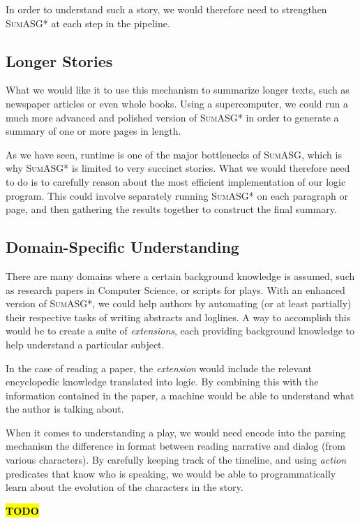 \begin{itemize}[nolisstep]

\end{itemize}

In order to understand such a story, we would therefore need to strengthen \textsc{SumASG*} at each step in the pipeline.

\subsection{Longer Stories}

What we would like it to use this mechanism to summarize longer texts, such as newspaper articles or even whole books. Using a supercomputer, we could run a much more advanced and polished version of \textsc{SumASG*} in order to generate a summary of one or more pages in length.

As we have seen, runtime is one of the major bottlenecks of \textsc{SumASG}, which is why \textsc{SumASG*} is limited to very succinct stories. What we would therefore need to do is to carefully reason about the most efficient implementation of our logic program. This could involve separately running \textsc{SumASG*} on each paragraph or page, and then gathering the results together to construct the final summary.

\subsection{Domain-Specific Understanding}

There are many domains where a certain background knowledge is assumed, such as research papers in Computer Science, or scripts for plays. With an enhanced version of \textsc{SumASG*}, we could help authors by automating (or at least partially) their respective tasks of writing abstracts and loglines. A way to accomplish this would be to create a suite of \textit{extensions}, each providing background knowledge to help understand a particular subject.

In the case of reading a paper, the \textit{extension} would include the relevant encyclopedic knowledge translated into logic. By combining this with the information contained in the paper, a machine would be able to understand what the author is talking about.

When it comes to understanding a play, we would need encode into the parsing mechanism the difference in format between reading narrative and dialog (from various characters). By carefully keeping track of the timeline, and using \textit{action} predicates that know who is speaking, we would be able to programmatically learn about the evolution of the characters in the story.

\textcolor{red}{\textbf{\hl{TODO}}}